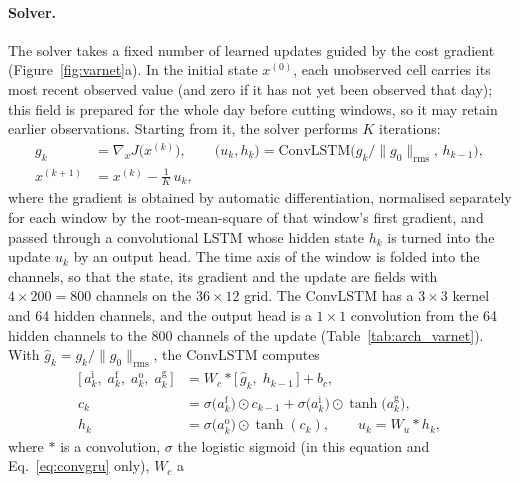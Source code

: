 \documentclass[english, 12pt, a4paper, elec, utf8, a-2b, online]{aaltothesis}
\begin{document}
\paragraph{Solver.}
The solver takes a fixed number of learned updates guided by the cost gradient
(Figure~\ref{fig:varnet}a).
In the initial state $x^{(0)}$, each unobserved cell carries its most recent
observed value (and zero if it has not yet been observed that day); this field
is prepared for the whole day before cutting windows, so it may retain earlier
observations. Starting from it, the solver performs $K$ iterations:
\begin{equation}
	\begin{aligned}
	g_k &= \nabla_x J\big(x^{(k)}\big), \qquad
	\big(u_k, h_k\big) = \mathrm{ConvLSTM}\big(g_k / \|g_0\|_{\mathrm{rms}},\, h_{k-1}\big), \\
	x^{(k+1)} &= x^{(k)} - \frac{1}{K}\, u_k,
	\end{aligned}
	\label{eq:solver}
\end{equation}
where the gradient is obtained by automatic differentiation, normalised
separately for each window by the root-mean-square of that window's first
gradient, and passed through a convolutional LSTM
whose hidden state $h_k$ is turned into the update $u_k$ by an output head. The
time axis of the window is folded into the channels, so that the state, its
gradient and the update are fields with $4 \times 200 = 800$ channels on the
$36 \times 12$ grid. The ConvLSTM has a $3 \times 3$ kernel and 64 hidden
channels, and the output head is a $1 \times 1$ convolution from the 64 hidden
channels to the 800 channels of the update (Table~\ref{tab:arch_varnet}).
With $\hat{g}_k = g_k / \|g_0\|_{\mathrm{rms}}$, the ConvLSTM
\cite{shi2015convlstm} computes
\begin{equation}
	\begin{aligned}
	\big[\, a^{\mathrm{i}}_k,\; a^{\mathrm{f}}_k,\; a^{\mathrm{o}}_k,\; a^{\mathrm{g}}_k \,\big]
	&= W_c \ast \big[\, \hat{g}_k,\; h_{k-1} \,\big] + b_c, \\
	c_k &= \sigma\big(a^{\mathrm{f}}_k\big) \odot c_{k-1} + \sigma\big(a^{\mathrm{i}}_k\big) \odot \tanh\big(a^{\mathrm{g}}_k\big), \\
	h_k &= \sigma\big(a^{\mathrm{o}}_k\big) \odot \tanh(c_k),
	\qquad
	u_k = W_u \ast h_k,
	\end{aligned}
	\label{eq:convlstm}
\end{equation}
where $\ast$ is a convolution, $\sigma$ the logistic sigmoid (in this equation and Eq.~\eqref{eq:convgru} only), $W_c$ a
\end{document}
